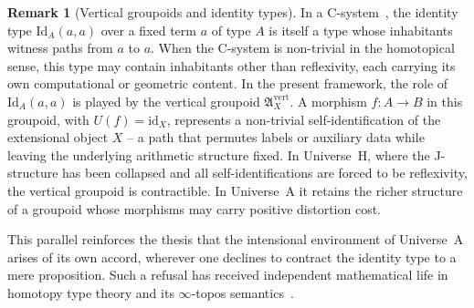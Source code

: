 \documentclass[10pt, reqno]{amsart}
\theoremstyle{plain}
\theoremstyle{definition}
\newtheorem{remark}[theorem]{Remark}
\theoremstyle{plain}
\begin{document}
\begin{remark}[Vertical groupoids and identity types]\label{rem:VerticalGroupoidCsystems}
In a C-system~\cite{voevodsky2023martin}, the identity type $\mathrm{Id}_A(a,a)$ over a fixed term $a$ of type $A$ is itself a type whose inhabitants witness paths from $a$ to $a$. When the C-system is non-trivial in the homotopical sense, this type may contain inhabitants other than reflexivity, each carrying its own computational or geometric content. In the present framework, the role of $\mathrm{Id}_A(a,a)$ is played by the vertical groupoid $\mathfrak{A}_X^{\mathrm{vert}}$. A morphism $f \colon A \to B$ in this groupoid, with $U(f) = \mathrm{id}_X$, represents a non-trivial self-identification of the extensional object $X$ -- a path that permutes labels or auxiliary data while leaving the underlying arithmetic structure fixed. In Universe~H, where the J-structure has been collapsed and all self-identifications are forced to be reflexivity, the vertical groupoid is contractible. In Universe~A it retains the richer structure of a groupoid whose morphisms may carry positive distortion cost.

This parallel reinforces the thesis that the intensional environment of Universe~A arises of its own accord, wherever one declines to contract the identity type to a mere proposition. Such a refusal has received independent mathematical life in homotopy type theory and its $\infty$-topos semantics~\cite{Riehl2024}.
\end{remark}
\end{document}
